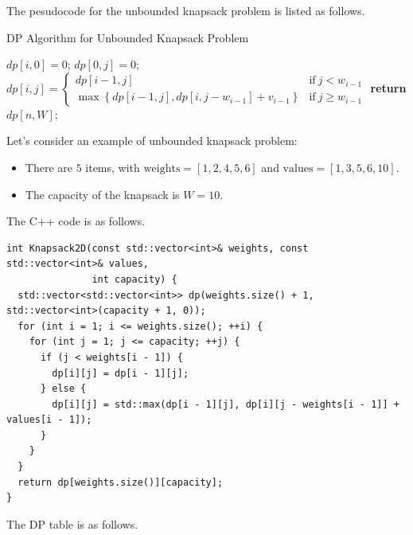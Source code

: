 The pesudocode for the unbounded knapsack problem is listed as follows.
\begin{algorithm}[H]\label{algorithm:unbounded_knapsack_problem_1}
\caption{DP Algorithm for Unbounded Knapsack Problem}
\begin{algorithmic}[1]
 
    \State $dp[i, 0] = 0$;
\EndFor
{}  
    \State $dp[0, j] = 0$;
\EndFor
{}
        \State 
        $dp[i, j] = 
        \begin{cases} 
            dp[i - 1, j] & \text{if}\ j < w_{i-1}\\
            \max\left\{dp[i - 1, j], dp[i, j - w_{i-1}] + v_{i-1}\right\} & \text{if}\ j \geq w_{i-1}
        \end{cases}$
    \EndFor
\EndFor
\State \textbf{return} $dp[n, W]$;
\end{algorithmic}
\end{algorithm}

Let's consider an example of unbounded knapsack problem:
\begin{itemize}
\item There are $5$ items, with $\text{weights} = \left[1, 2, 4, 5, 6\right]$ and $\text{values} =  \left[1, 3, 5, 6, 10\right]$.
\item The capacity of the knapsack is $W = 10$.
\end{itemize}

The C++ code is as follows.
\begin{lstlisting}
int Knapsack2D(const std::vector<int>& weights, const std::vector<int>& values,
               int capacity) {
  std::vector<std::vector<int>> dp(weights.size() + 1, std::vector<int>(capacity + 1, 0));
  for (int i = 1; i <= weights.size(); ++i) {
    for (int j = 1; j <= capacity; ++j) {
      if (j < weights[i - 1]) {
        dp[i][j] = dp[i - 1][j];
      } else {
        dp[i][j] = std::max(dp[i - 1][j], dp[i][j - weights[i - 1]] + values[i - 1]);
      }
    }
  }
  return dp[weights.size()][capacity];
}
\end{lstlisting}

The DP table is as follows.

